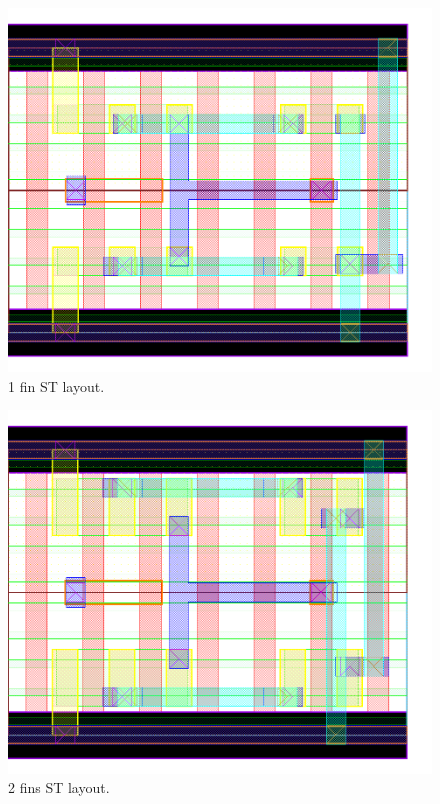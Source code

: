 \documentclass[pgmicro,mestrado,english]{iiufrgs}
\begin{document}
\begin{figure}[H]
\centering
\includegraphics[width=\textwidth,height=\textheight,keepaspectratio]{ST1F.png}
\caption{1 fin ST layout.}
\label{fig:ST1F}
\end{figure}

\begin{figure}[H]
\centering
\includegraphics[width=\textwidth,height=\textheight,keepaspectratio]{ST2F.png}
\caption{2 fins ST layout.}
\label{fig:ST2F}
\end{figure}
\end{document}
